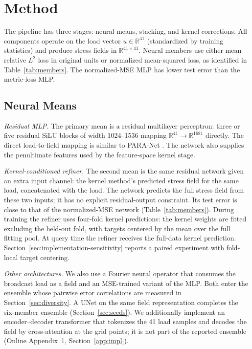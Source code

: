 \documentclass[twoside,11pt]{article}
\begin{document}
\section{Method}
\label{sec:method}
The pipeline has three stages: neural means, stacking, and kernel
corrections. All components operate on the load vector $u\in\mathbb R^{41}$
(standardized by training statistics) and produce stress fields in
$\mathbb R^{41\times41}$. Neural members use either mean relative $L^2$ loss in original units or normalized mean-squared loss, as identified in Table~\ref{tab:members}. The normalized-MSE MLP has lower test error than the metric-loss MLP.

\subsection{Neural Means}
\emph{Residual MLP.} The primary mean is a residual multilayer perceptron:
three or five residual SiLU blocks of width 1024--1536 mapping
$\mathbb R^{41}\to\mathbb R^{1681}$ directly. The direct load-to-field mapping is similar to PARA-Net
\citep{dehoop2022cost}. The network also supplies the
penultimate features used by the feature-space kernel stage.

\emph{Kernel-conditioned refiner.} The second mean is the same residual network
given an extra input channel: the kernel method's predicted stress field for
the same load, concatenated with the load. The network predicts the full stress
field from these two inputs; it has no explicit residual-output constraint.
Its test error is close to that of the normalized-MSE network
(Table~\ref{tab:members}). During training the refiner uses four-fold kernel predictions: the kernel weights are fitted excluding the held-out fold, with targets centered by the mean over the full fitting pool. At query time the refiner receives the full-data kernel prediction. Section~\ref{sec:implementation-sensitivity} reports a paired experiment with fold-local target centering.

\emph{Other architectures.} We also use a Fourier neural operator \citep{li2021fourier}
that consumes the broadcast load as a field and an MSE-trained variant of the
MLP. Both enter the ensemble whose pairwise error correlations are measured in
Section~\ref{sec:diversity}. A UNet on the same field representation completes
the six-member ensemble (Section~\ref{sec:seeds}). We
additionally implement an encoder--decoder
transformer \citep{vaswani2017attention,dosovitskiy2021image} that tokenizes
the 41 load samples and decodes the field by cross-attention at the grid
points; it is not part of the reported ensemble (Online Appendix~1, Section~\ref{app:impl}).
\end{document}
